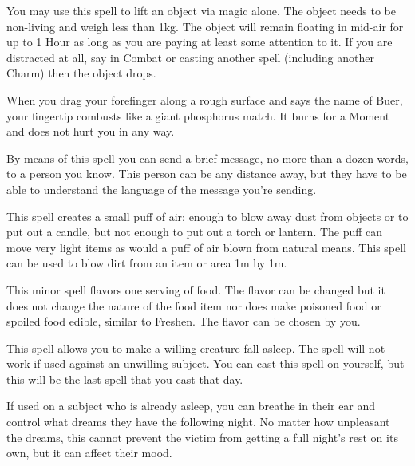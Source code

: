 {  

  You may use this spell to lift an object via magic alone. The object needs to be non-living and weigh less than 1kg. The object will remain floating in mid-air for up to 1 Hour as long as you are paying at least some attention to it. If you are distracted at all, say in Combat or casting another spell (including another Charm) then the object drops. 


  When you drag your forefinger along a rough surface and says the name of Buer, your fingertip combusts like a giant phosphorus match. It burns for a Moment and does not hurt you in any way.


  By means of this spell you can send a brief message, no more than a dozen words, to a person you know. This person can be any distance away, but they have to be able to understand the language of the message you're sending.


  This spell creates a small puff of air; enough to blow away dust from objects or to put out a candle, but not enough to put out a torch or lantern. The puff can move very light items as would a puff of air blown from natural means. This spell can be used to blow dirt from an item or area 1m by 1m. 


  This minor spell flavors one serving of food. The flavor can be changed but it does not change the nature of the food item nor does make poisoned food or spoiled food edible, similar to Freshen. The flavor can be chosen by you. 

  This spell allows you to make a willing creature fall asleep. The spell will not work if used against an unwilling subject. You can cast this spell on yourself, but this will be the last spell that you cast that day.

  If used on a subject who is already asleep, you can breathe in their ear and control what dreams they have the following night. No matter how unpleasant the dreams, this cannot prevent the victim from getting a full night’s rest on its own, but it can affect their mood.


}
